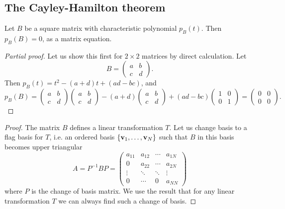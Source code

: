 \documentclass[10pt, a4paper]{article}
\begin{document}
\subsection{The Cayley-Hamilton theorem}
\begin{theorem}
    Let $B$ be a square matrix with characteristic polynomial $p_B(t)$.
    Then $p_B(B) = 0$,
    as a matrix equation.
    \begin{proof}[Partial proof]
        Let us show this first for $2 \times 2$ matrices by direct calculation.
        Let
        \[
        B = \begin{pmatrix}
            a & b \\ c & d
        \end{pmatrix}.
        \]
        Then $p_B(t) = t ^ 2 - (a + d)t + (ad - bc)$,
        and
        \[
        p_B(B) = \begin{pmatrix}
            a & b \\ c & d
        \end{pmatrix}\begin{pmatrix}
            a & b \\ c & d
        \end{pmatrix} - (a + d)\begin{pmatrix}
            a & b \\ c & d
        \end{pmatrix} + (ad - bc)\begin{pmatrix}
            1 & 0 \\ 0 & 1
        \end{pmatrix} = \begin{pmatrix}
            0 & 0 \\
            0 & 0
        \end{pmatrix}.
        \]
    \end{proof}
    \begin{proof}
        The matrix $B$ defines a linear transformation $T$.
        Let us change basis to a flag basis for $T$,
        i.e.
        an ordered basis $\{\mathbf{v}_1, \dotsc, \mathbf{v}_N\}$ such that $B$ in this basis becomes upper triangular
        \[
        A = P ^ {-1}BP = \begin{pmatrix}
            a_{11} & a_{12} & \dotsi & a_{1N} \\
            0 & a_{22} & \dotsi & a_{2N} \\
            \vdots & \ddots & \ddots & \vdots \\
            0 & \dotsi & 0 & a_{NN}
        \end{pmatrix}
        \]
        where $P$ is the change of basis matrix.
        We use the result that for any linear transformation $T$ we can always find such a change of basis.


\end{proof}
\end{theorem}
\end{document}
